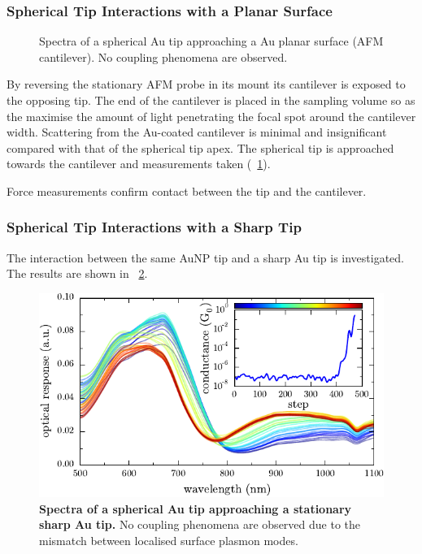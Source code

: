 \documentclass[a4paper]{article}
\begin{document}
\subsubsection{Spherical Tip Interactions with a Planar Surface}

\begin{figure}[h]
\centering
\caption[]{Spectra of a spherical Au tip approaching a Au planar surface (AFM cantilever). No coupling phenomena are observed.}
\label{fig:spherical_tip_cantilever_scan}
\end{figure}

By reversing the stationary AFM probe in its mount its cantilever is exposed to the opposing tip. The end of the cantilever is placed in the sampling volume so as the maximise the amount of light penetrating the focal spot around the cantilever width. Scattering from the Au-coated cantilever is minimal and insignificant compared with that of the spherical tip apex. The spherical tip is approached towards the cantilever and measurements taken (\figurename~\ref{fig:spherical_tip_cantilever_scan}).

Force measurements confirm contact between the tip and the cantilever.

\subsubsection{Spherical Tip Interactions with a Sharp Tip}

The interaction between the same AuNP tip and a sharp Au tip is investigated. The results are shown in \figurename~\ref{fig:spherical_sharp_tip_scan}.

\begin{figure}[h]
\centering
\includegraphics{figures/sharp-AuNP_tip_dimer}
\caption[Spectra of a spherical Au tip approaching a stationary sharp Au tip]{\textbf{Spectra of a spherical Au tip approaching a stationary sharp Au tip.} No coupling phenomena are observed due to the mismatch between localised surface plasmon modes.}
\label{fig:spherical_sharp_tip_scan}
\end{figure}
\end{document}
